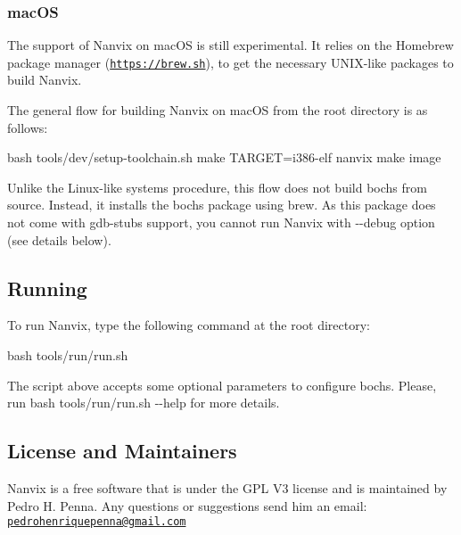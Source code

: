 \subsubsection*{mac\+OS}

The support of Nanvix on mac\+OS is still experimental. It relies on the Homebrew package manager (\href{https://brew.sh}{\tt https\+://brew.\+sh}), to get the necessary U\+N\+I\+X-\/like packages to build Nanvix.

The general flow for building Nanvix on mac\+OS from the root directory is as follows\+:


\begin{DoxyCode}
bash tools/dev/setup-toolchain.sh
make TARGET=i386-elf nanvix
make image
\end{DoxyCode}


Unlike the Linux-\/like systems procedure, this flow does not build bochs from source. Instead, it installs the bochs package using brew. As this package does not come with gdb-\/stubs support, you cannot run Nanvix with {\ttfamily -\/-\/debug} option (see details below).

\subsection*{Running}

To run Nanvix, type the following command at the root directory\+:


\begin{DoxyCode}
bash tools/run/run.sh
\end{DoxyCode}


The script above accepts some optional parameters to configure bochs. Please, run {\ttfamily bash tools/run/run.\+sh -\/-\/help} for more details.

\subsection*{License and Maintainers}

Nanvix is a free software that is under the G\+PL V3 license and is maintained by Pedro H. Penna. Any questions or suggestions send him an email\+: \href{mailto:pedrohenriquepenna@gmail.com}{\tt pedrohenriquepenna@gmail.\+com} 